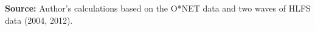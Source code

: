 \begin{table}[H]
\textbf{Source: }Author's calculations based on the O{*}NET data and
two waves of HLFS data (2004, 2012).
\end{table}
